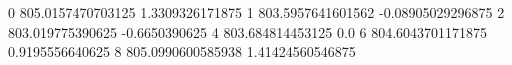0 805.0157470703125 1.3309326171875
1 803.5957641601562 -0.08905029296875
2 803.019775390625 -0.6650390625
4 803.684814453125 0.0
6 804.6043701171875 0.9195556640625
8 805.0990600585938 1.41424560546875

